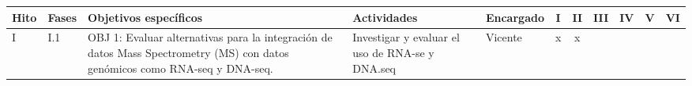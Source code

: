 \documentclass[a4paper,11pt]{article}
\begin{document}
\begin{table}[H]
	\scriptsize
	\begin{tabular}{p{0.6cm}p{0.6cm}p{6cm}p{4cm}p{1cm}cccccc} \\ \hline
		
		
		
		
		
		\textbf{Hito}        & \textbf{Fases}        & \textbf{Objetivos específicos}                                                                                                                                                                                                                                                             & \textbf{Actividades}                                                                                 & \textbf{Encargado} & \multicolumn{1}{c}{I} & \multicolumn{1}{c}{II} & III                  & IV                   & \multicolumn{1}{c}{V} & \multicolumn{1}{c}{VI} \\  \hline
		
		\multirow{17}{*}{I}  & \multirow{3}{*}{I.1}  & \multirow{3}{6cm}{OBJ 1: Evaluar alternativas para la integración de datos Mass Spectrometry (MS) con datos genómicos como RNA-seq y DNA-seq.}                                                                                                                                            & Investigar y evaluar el uso de RNA-se y DNA.seq                                                      & Vicente            & \multicolumn{1}{c}{x} & \multicolumn{1}{c}{x}  & \multicolumn{1}{l}{} & \multicolumn{1}{l}{} &                       &                        \\
		

\end{tabular}
\end{table}
\end{document}
